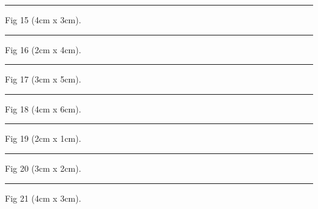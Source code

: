 \documentclass[a4paper,11pt]{article}
\begin{document}
\begin{swarmwrap}%
  \begin{minipage}[t]{4cm}
    \centering
    \rule{\linewidth}{3cm}
    {\footnotesize Fig 15 (4cm x 3cm).}
  \end{minipage}%
\end{swarmwrap}%
\swarmwrapnext
\lipsum[15]%

\begin{swarmwrap}%
  \begin{minipage}[t]{2cm}
    \centering
    \rule{\linewidth}{4cm}
    {\footnotesize Fig 16 (2cm x 4cm).}
  \end{minipage}%
\end{swarmwrap}%
\swarmwrapnext
\lipsum[16]%

\begin{swarmwrap}%
  \begin{minipage}[t]{3cm}
    \centering
    \rule{\linewidth}{5cm}
    {\footnotesize Fig 17 (3cm x 5cm).}
  \end{minipage}%
\end{swarmwrap}%
\swarmwrapnext
\lipsum[17]%

\begin{swarmwrap}%
  \begin{minipage}[t]{4cm}
    \centering
    \rule{\linewidth}{6cm}
    {\footnotesize Fig 18 (4cm x 6cm).}
  \end{minipage}%
\end{swarmwrap}%
\swarmwrapnext
\lipsum[18]%

\begin{swarmwrap}%
  \begin{minipage}[t]{2cm}
    \centering
    \rule{\linewidth}{1cm}
    {\footnotesize Fig 19 (2cm x 1cm).}
  \end{minipage}%
\end{swarmwrap}%
\swarmwrapnext
\lipsum[19]%

\begin{swarmwrap}%
  \begin{minipage}[t]{3cm}
    \centering
    \rule{\linewidth}{2cm}
    {\footnotesize Fig 20 (3cm x 2cm).}
  \end{minipage}%
\end{swarmwrap}%
\swarmwrapnext
\lipsum[20]%

\begin{swarmwrap}%
  \begin{minipage}[t]{4cm}
    \centering
    \rule{\linewidth}{3cm}
    {\footnotesize Fig 21 (4cm x 3cm).}
  \end{minipage}%
\end{swarmwrap}%
\swarmwrapnext
\lipsum[21]%
\end{document}
